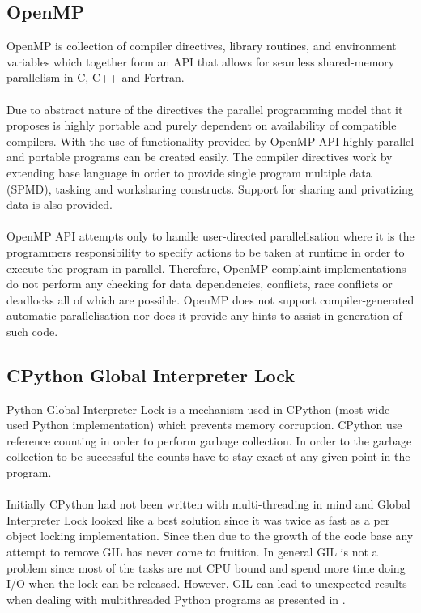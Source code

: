 \documentclass[12pt, a4paper]{report}
\begin{document}
\subsection{OpenMP}
OpenMP\cite{OpenMP4.0} is collection of compiler directives, library routines, and environment variables
which together form an API that allows for seamless shared-memory parallelism
in C, C++ and Fortran.
\\\\
Due to abstract nature of the directives the parallel programming model that it proposes
is highly portable and purely dependent on availability of compatible compilers.
With the use of functionality provided by OpenMP API highly parallel and portable programs
can be created easily. The compiler directives work by extending base language in
order to provide single program multiple data (SPMD), tasking and worksharing constructs.
Support for sharing and privatizing data is also provided.
\\\\
OpenMP API attempts only to handle user-directed parallelisation where it is the programmers
responsibility to specify actions to be taken at runtime in order to execute the program
in parallel. Therefore, OpenMP complaint implementations do not perform any checking for
data dependencies, conflicts, race conflicts or deadlocks all of which are possible.
OpenMP does not support compiler-generated automatic parallelisation nor does it provide
any hints to assist in generation of such code.

\subsection{CPython Global Interpreter Lock}\label{subsec:gil}
Python Global Interpreter Lock is a mechanism used in CPython (most wide used Python implementation)
which prevents memory corruption. CPython use reference counting in order to perform garbage collection.
In order to the garbage collection to be successful the counts have to stay exact at any given point
in the program.
\\\\
Initially CPython had not been written with multi-threading in mind and Global Interpreter Lock
looked like a best solution since it was twice as fast as a per object locking implementation.
Since then due to the growth of the code base any attempt to remove GIL has never come to fruition.
In general GIL is not a problem since most of the tasks are not CPU bound and spend more time doing
I/O when the lock can be released. However, GIL can lead to unexpected results when dealing with
multithreaded Python programs as presented in \cite{UnderstandingGIL}.




 
\end{document}
